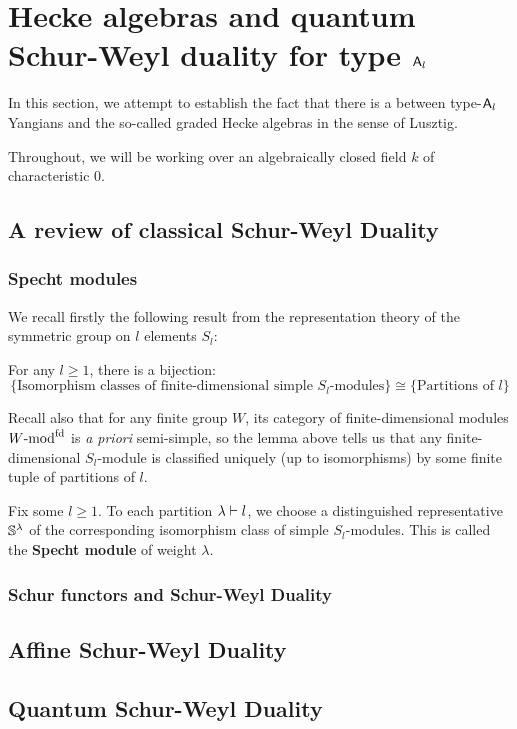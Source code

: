 \section{Hecke algebras and quantum Schur-Weyl duality for type \texorpdfstring{$\mathsf{A}_l$}{}}
    In this section, we attempt to establish the fact that there is a  between type-$\mathsf{A}_l$ Yangians and the so-called graded Hecke algebras in the sense of Lusztig. 
    
    \begin{convention}
        Throughout, we will be working over an algebraically closed field $k$ of characteristic $0$.
    \end{convention}

    \subsection{A review of classical Schur-Weyl Duality}
        \subsubsection{Specht modules}
            We recall firstly the following result from the representation theory of the symmetric group on $l$ elements $S_l$:
            \begin{lemma} \label{lemma: classification_of_simple_modules_over_symmetric_groups}
                For any $l \geq 1$, there is a bijection:
                    $$\{ \text{Isomorphism classes of finite-dimensional simple $S_l$-modules} \} \cong \{ \text{Partitions of $l$} \}$$
            \end{lemma}
            Recall also that for any finite group $W$, its category of finite-dimensional modules $W\text{-}\mathrm{mod}^{\mathrm{fd}}$ is \textit{a priori} semi-simple, so the lemma above tells us that any finite-dimensional $S_l$-module is classified uniquely (up to isomorphisms) by some finite tuple of partitions of $l$. 
            \begin{definition} \label{def: specht_modules}
                Fix some $l \geq 1$. To each partition $\lambda \vdash l$, we choose a distinguished representative $\mathbb{S}^{\lambda}$ of the corresponding isomorphism class of simple $S_l$-modules. This is called the \textbf{Specht module} of weight $\lambda$. 
            \end{definition}

        \subsubsection{Schur functors and Schur-Weyl Duality}

    \subsection{Affine Schur-Weyl Duality}

    \subsection{Quantum Schur-Weyl Duality}